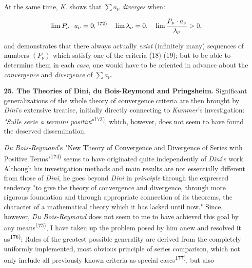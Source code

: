 \thispagestyle{fancy}

\vspace{0.5cm}

At the same time, \textit{K}. shows that $\sum a_\nu$ \textit{diverges} when:

\vspace{-0.5cm}
\begin{align}
    \lim P_\nu \cdot a_\nu = 0,\textsuperscript{172)} \quad \lim \lambda_\nu = 0, \quad \lim \frac{P_\nu \cdot a_\nu}{\lambda_\nu} > 0,
\end{align}
\vspace{-0.5cm}

and demonstrates that there always actually \textit{exist} (infinitely many) sequences of numbers $(P_\nu)$ which satisfy one of the criteria (18) (19); but to be able to determine them in each \textit{case}, one would have to be oriented in advance about the \textit{convergence} and \textit{divergence} of $\sum a_\nu$.

\vspace{0.3cm}
\textbf{25. The Theories of Dini, du Bois-Reymond and Pringsheim.} Significant generalizations of the whole theory of convergence criteria are then brought by \textit{Dini}'s extensive treatise, initially directly connecting to \textit{Kummer}'s investigation: \textit{"Sulle serie a termini positivi}"\textsuperscript{173)}, which, however, does not seem to have found the deserved dissemination.

\textit{Du Bois-Reymond}'s "New Theory of Convergence and Divergence of Series with Positive Terms"\textsuperscript{174)} seems to have originated quite independently of \textit{Dini}'s work. Although his investigation methods and main results are not essentially different from those of \textit{Dini}, he goes beyond \textit{Dini} in \textit{principle} through the expressed tendency "to give the theory of convergence and divergence, through more rigorous foundation and through appropriate connection of its theorems, the character of a mathematical theory which it has lacked until now." Since, however, \textit{Du Bois-Reymond} does not seem to me to have achieved this goal by any means\textsuperscript{175)}, I have taken up the problem posed by him anew and resolved it as\textsuperscript{176)}: Rules of the greatest possible generality are derived from the completely uniformly implemented, most obvious principle of series comparison, which not only include all previously known criteria as special cases\textsuperscript{177)}, but also

